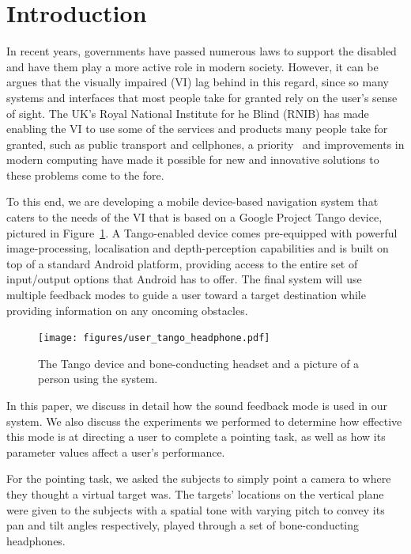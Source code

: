 \documentclass[format=sigconf, review=true, screen=true, anonymous=true]{acmart}
\begin{document}
\maketitle

\section{Introduction}

In recent years, governments have passed numerous laws to support the disabled and have them play a more active role in modern society. However, it can be argues that the visually impaired (VI) lag behind in this regard, since so many systems and interfaces that most people take for granted rely on the user's sense of sight. The UK's Royal National Institute for he Blind (RNIB) has made enabling the VI to use some of the services and products many people take for granted, such as public transport and cellphones, a priority~\cite{rnib-objectives} and improvements in modern computing have made it possible for new and innovative solutions to these problems come to the fore.

To this end, we are developing a mobile device-based navigation system that caters to the needs of the VI that is based on a Google Project Tango device, pictured in Figure~\ref{fig:tango}. A Tango-enabled device comes pre-equipped with powerful image-processing, localisation and depth-perception capabilities and is built on top of a standard Android platform, providing access to the entire set of input/output options that Android has to offer. The final system will use multiple feedback modes to guide a user toward a target destination while providing information on any oncoming obstacles.

\begin{figure}
  \centering
  \texttt{[image: figures/user\_tango\_headphone.pdf]}
  \caption{The Tango device and bone-conducting headset and a picture of a person using the system. }
  \label{fig:tango}
\end{figure}

In this paper, we discuss in detail how the sound feedback mode is used in our system. We also discuss the experiments we performed to determine how effective this mode is at directing a user to complete a pointing task, as well as how its parameter values affect a user's performance. 

For the pointing task, we asked the subjects to simply point a camera to where they thought a virtual target was. The targets' locations on the vertical plane were given to the subjects with a spatial tone with varying pitch to convey its pan and tilt angles respectively, played through a set of bone-conducting headphones. 
\end{document}
